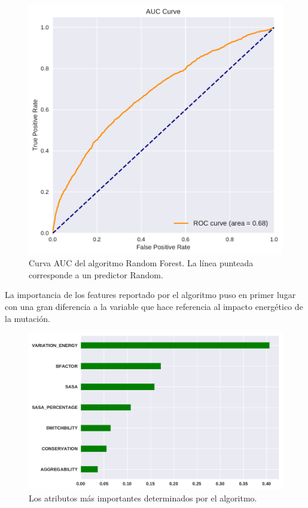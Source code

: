 \begin{figure}[h]
    \centering
    \includegraphics[scale=0.73]{documents/latex/figures/3/auc_varq.pdf}
    \caption{Curva AUC del algoritmo Random Forest. La línea punteada corresponde a un predictor Random.}
    \label{fig:auc_varq}
\end{figure}

La importancia de los features reportado por el algoritmo puso en primer lugar con una gran diferencia a la variable que hace referencia al impacto energético de la mutación.  


\begin{figure}[H]
    \centering
    \includegraphics[scale=0.73]{documents/latex/figures/3/importances_varq.pdf}
    \caption{Los atributos más importantes determinados por el algoritmo.}
    \label{fig:importance_varq}
\end{figure}


